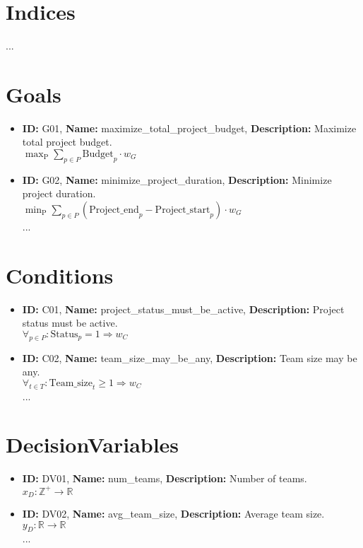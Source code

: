 \documentclass{article}
\begin{document}
\section{Indices}
...

\section{Goals}
\begin{itemize}[leftmargin=*]
  \item \textbf{ID:} G01, \textbf{Name:} maximize\_total\_project\_budget, \textbf{Description:} Maximize total project budget.\\
    \(\max_{\text{P}} \sum_{p \in P} \text{{Budget}}_p \cdot w_G\) \\
  \item \textbf{ID:} G02, \textbf{Name:} minimize\_project\_duration, \textbf{Description:} Minimize project duration.\\
    \(\min_{\text{P}} \sum_{p \in P} (\text{{Project\_end}}_p - \text{{Project\_start}}_p) \cdot w_G\) \\
  ...
\end{itemize}

\section{Conditions}
\begin{itemize}[leftmargin=*]
  \item \textbf{ID:} C01, \textbf{Name:} project\_status\_must\_be\_active, \textbf{Description:} Project status must be active.\\
    \(\forall_{p \in P}: \text{{Status}}_p = 1 \Rightarrow w_C\) \\
  \item \textbf{ID:} C02, \textbf{Name:} team\_size\_may\_be\_any, \textbf{Description:} Team size may be any.\\
    \(\forall_{t \in T}: \text{{Team\_size}}_t \geq 1 \Rightarrow w_C\) \\
  ...
\end{itemize}

\section{DecisionVariables}
\begin{itemize}[leftmargin=*]
  \item \textbf{ID:} DV01, \textbf{Name:} num\_teams, \textbf{Description:} Number of teams.\\
    \(x_D: \mathbb{Z}^+ \rightarrow \mathbb{R}\) \\
  \item \textbf{ID:} DV02, \textbf{Name:} avg\_team\_size, \textbf{Description:} Average team size.\\
    \(y_D: \mathbb{R} \rightarrow \mathbb{R}\) \\
  ...
\end{itemize}
\end{document}
